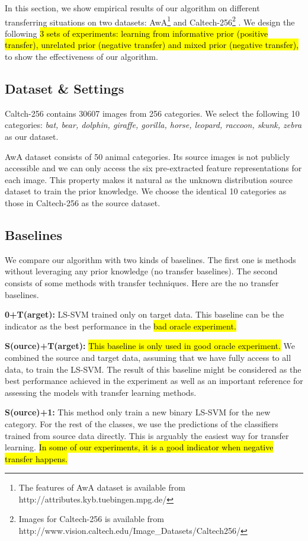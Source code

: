 In this section, we show empirical results of our algorithm on different transferring situations on two datasets: AwA\footnote{The features of AwA dataset is available from http://attributes.kyb.tuebingen.mpg.de/} \cite{lampert2009learning} and Caltech-256\footnote{Images for Caltech-256 is available from http://www.vision.caltech.edu/Image\_Datasets/Caltech256/} \cite{griffin2007caltech}. We design the following \hl{3 sets of experiments: learning from informative prior (positive transfer), unrelated prior (negative transfer) and mixed prior (negative transfer), } to show the effectiveness of our algorithm.
\subsection{Dataset \& Settings}
Caltch-256 contains 30607 images from 256 categories. We select the following 10 categories: \textit{bat, bear, dolphin, giraffe, gorilla, horse, leopard, raccoon, skunk, zebra} as our dataset.

AwA dataset consists of 50 animal categories. Its source images is not publicly accessible and we can only access the six pre-extracted feature representations for each image. This property makes it natural as the unknown distribution source dataset to train the prior knowledge. We choose the identical 10 categories as those in Caltech-256 as the source dataset.

\subsection{Baselines}
We compare our algorithm with two kinds of baselines. The first one is methods without leveraging any prior knowledge (no transfer baselines). The second consists of some methods with transfer techniques. Here are the no transfer baselines. 

\textbf{0+T(arget):} LS-SVM trained only on target data. This baseline can be the indicator as the best performance in the \hl{bad oracle experiment.}

\textbf{S(ource)+T(arget):} \hl{This baseline is only used in good oracle experiment.} We combined the source and target data, assuming that we have fully access to all data, to train the LS-SVM. The result of this baseline might be considered as the best performance achieved in the experiment as well as an important reference for assessing the models with transfer learning methods.

\textbf{S(ource)+1:} This method only train a new binary LS-SVM for the new category. For the rest of the classes, we use the predictions of the classifiers trained from source data directly. This is arguably the easiest way for transfer learning. \hl{In some of our experiments, it is a good indicator when negative transfer happens.} 


